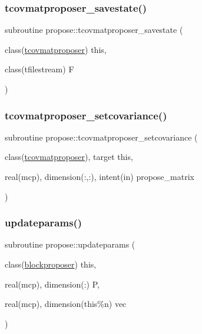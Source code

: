 \mbox{\label{namespacepropose_a9a1013a605e00c63e36aa86ab4d4e938}} 
\subsubsection{\texorpdfstring{tcovmatproposer\+\_\+savestate()}{tcovmatproposer\_savestate()}}
{\footnotesize\ttfamily subroutine propose\+::tcovmatproposer\+\_\+savestate (\begin{DoxyParamCaption}\item[{class(\mbox{\hyperlink{structpropose_1_1tcovmatproposer}{tcovmatproposer}})}]{this,  }\item[{class(tfilestream)}]{F }\end{DoxyParamCaption})}

\mbox{\label{namespacepropose_a8f227417f812244dfc68539ff9b75353}} 
\subsubsection{\texorpdfstring{tcovmatproposer\+\_\+setcovariance()}{tcovmatproposer\_setcovariance()}}
{\footnotesize\ttfamily subroutine propose\+::tcovmatproposer\+\_\+setcovariance (\begin{DoxyParamCaption}\item[{class(\mbox{\hyperlink{structpropose_1_1tcovmatproposer}{tcovmatproposer}}), target}]{this,  }\item[{real(mcp), dimension(\+:,\+:), intent(in)}]{propose\+\_\+matrix }\end{DoxyParamCaption})}

\mbox{\label{namespacepropose_aee79ab6a28983b4a95931840fa5592e3}} 
\subsubsection{\texorpdfstring{updateparams()}{updateparams()}}
{\footnotesize\ttfamily subroutine propose\+::updateparams (\begin{DoxyParamCaption}\item[{class(\mbox{\hyperlink{structpropose_1_1blockproposer}{blockproposer}})}]{this,  }\item[{real(mcp), dimension(\+:)}]{P,  }\item[{real(mcp), dimension(this\%n)}]{vec }\end{DoxyParamCaption})}



